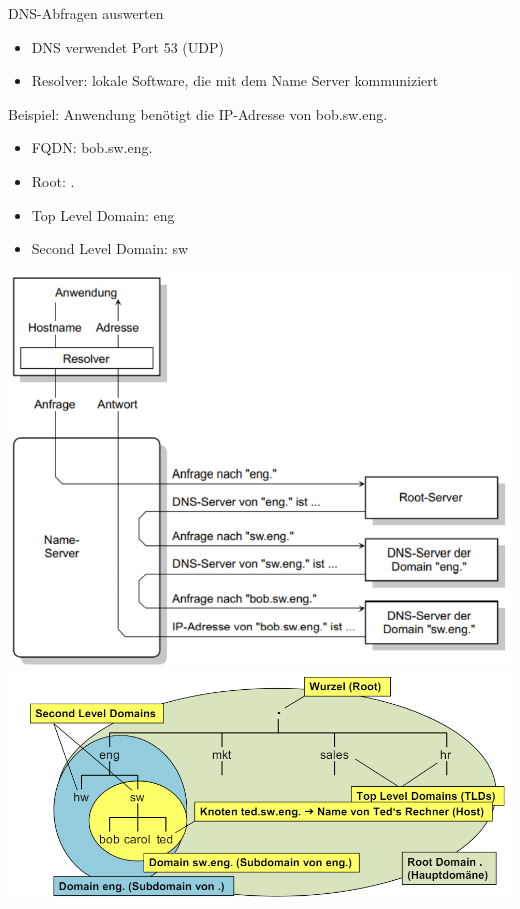 \begin{example2}{DNS-Abfragen auswerten}
    \begin{itemize}
        \item DNS verwendet Port 53 (UDP)
        \item Resolver: lokale Software, die mit dem Name Server kommuniziert
    \end{itemize}
    Beispiel: Anwendung benötigt die IP-Adresse von bob.sw.eng.
    \begin{itemize}
        \item FQDN: bob.sw.eng. 
        \item Root: .
        \item Top Level Domain: eng
        \item Second Level Domain: sw
    \end{itemize}
        \includegraphics[width=1\linewidth]{images/example_dns.png}\\
        \includegraphics[width=1\linewidth]{images/dns_explained.png}
\end{example2}

